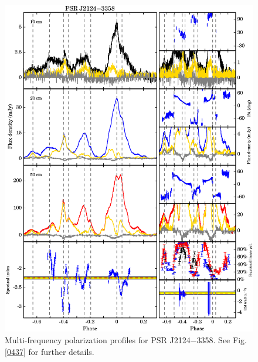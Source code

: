 \documentclass[useAMS,usenatbib]{mn2e}
\begin{document}
\begin{appendix}
\begin{figure}
\begin{center}
\includegraphics[width=6 in]{2124.ps}
\caption{Multi-frequency polarization profiles for PSR J2124$-$3358. 
See Fig. \ref{0437} for further details.}
\label{2124}
\end{center}
\end{figure}


\end{appendix}
\end{document}

